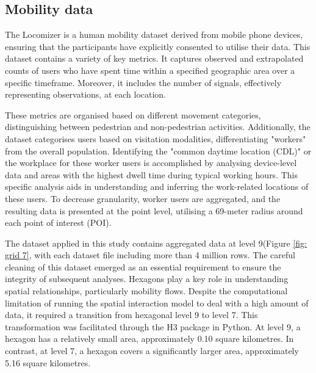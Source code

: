      \subsection{Mobility data} 

The Locomizer is a  human mobility dataset derived from mobile phone devices, ensuring that the participants have explicitly consented to utilise their data. This dataset contains a variety of key metrics. It captures observed and extrapolated counts of users who have spent time within a specified geographic area over a specific timeframe. Moreover, it includes the number of signals, effectively representing observations, at each location.

These metrics are organised based on different movement categories, distinguishing between pedestrian and non-pedestrian activities. Additionally, the dataset categorises users based on visitation modalities,  differentiating "workers" from the overall population. Identifying the "common daytime location (CDL)" or the workplace for these worker users is accomplished by analysing device-level data and areas with the highest dwell time during typical working hours. This specific analysis aids in understanding and inferring the work-related locations of these users. To decrease granularity, worker users are aggregated, and the resulting data is presented at the point level, utilising a 69-meter radius around each point of interest (POI).

The dataset applied in this study contains aggregated data at level 9(Figure \ref{fig: grid 7}, with each dataset file including more than 4 million rows. The careful cleaning of this dataset emerged as an essential requirement to ensure the integrity of subsequent analyses. Hexagons play a key role in understanding spatial relationships, particularly mobility flows. Despite the computational limitation of running the spatial interaction model to deal with a high amount of data,  it required a transition from hexagonal level 9 to level 7. This transformation was facilitated through the H3 package\citep{uberTablesCellStatistics2023} in Python. At level 9, a hexagon has a relatively small area, approximately 0.10 square kilometres. In contrast, at level 7, a hexagon covers a significantly larger area, approximately 5.16 square kilometres.

